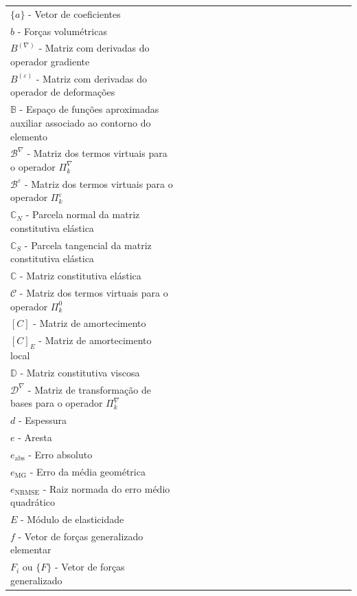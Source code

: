 

\begin{listasimb}

\begin{longtable}[l]{p{0.5\linewidth}p{15.0\linewidth}}

$\{a\}$ - Vetor de coeficientes \\
$b$ - Forças volumétricas \\
$B^{(\nabla)}$ - Matriz com derivadas do operador gradiente \\
$B^{(\varepsilon)}$ - Matriz com derivadas do operador de deformações \\
$\mathbb{B}$ - Espaço de funções aproximadas auxiliar associado ao contorno do elemento \\
$\mathcal{B}^\nabla$ - Matriz dos termos virtuais para o operador $\Pi_k^\nabla$ \\
$\mathcal{B}^\varepsilon$ - Matriz dos termos virtuais para o operador $\Pi_k^\varepsilon$ \\
$\mathbb{C}_N$ - Parcela normal da matriz constitutiva elástica \\
$\mathbb{C}_S$ - Parcela tangencial da matriz constitutiva elástica \\
$\mathbb{C}$ - Matriz constitutiva elástica \\
$\mathcal{C}$ - Matriz dos termos virtuais para o operador $\Pi_k^0$ \\
$\left[ C \right]$ - Matriz de amortecimento \\
$\left[ C \right]_E$ - Matriz de amortecimento local \\
$\mathbb{D}$ - Matriz constitutiva viscosa \\
$\mathcal{D}^\nabla$ - Matriz de transformação de bases para o operador $\Pi_k^\nabla$ \\
$d$ - Espessura \\
$e$ - Aresta \\
$e_{\mathrm{abs}}$ - Erro absoluto \\
$e_{\mathrm{MG}}$ - Erro da média geométrica \\
$e_{\mathrm{NRMSE}}$ - Raiz normada do erro médio quadrático \\
$E$ - Módulo de elasticidade \\
$f$ - Vetor de forças generalizado elementar \\
$F_i$ ou $\{F\}$ - Vetor de forças generalizado \\

\end{longtable}
\end{listasimb}

